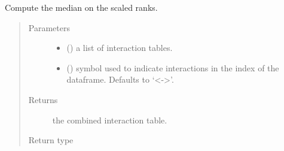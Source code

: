 \documentclass[letterpaper,10pt,english]{sphinxmanual}
\begin{document}
\begin{fulllineitems}
\label{\detokenize{_modules/cosifer.combiners:cosifer.combiners.cit.median_scaled_ranks_table}}
Compute the median on the scaled ranks.
\begin{quote}\begin{description}
\item[{Parameters}] \leavevmode\begin{itemize}
\item {} 
 () \textendash{} a list of interaction tables.

\item {} 
 (\sphinxstyleliteralemphasis{\sphinxupquote{, }}) \textendash{} symbol used to indicate
interactions in the index of the dataframe. Defaults to ‘\textless{}-\textgreater{}’.

\end{itemize}

\item[{Returns}] \leavevmode
the combined interaction table.

\item[{Return type}] \leavevmode
{\hyperref[\detokenize{_modules/cosifer.collections:cosifer.collections.interaction_table.InteractionTable}]{}}

\end{description}\end{quote}

\end{fulllineitems}

\end{document}
